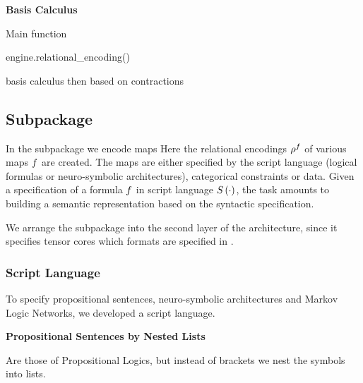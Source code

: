 \textbf{Basis Calculus}

Main function 
\begin{centeredcode}
	engine.relational\_encoding()
\end{centeredcode}
basis calculus then based on contractions





\subsection{Subpackage \spencoding}

In the \spencoding subpackage we encode maps 
Here the relational encodings $\rho^{f}$ of various maps $f$ are created.
%
The maps are either specified by the script language (logical formulas or neuro-symbolic architectures), categorical constraints or data.
Given a specification of a formula $f$ in script language $S\left(\cdot\right)$, the task amounts to building a semantic representation based on the syntactic specification.

We arrange the \spencoding subpackage into the second layer of the \tnreason architecture, since it specifies tensor cores which formats are specified in \spengine.


\subsubsection{Script Language}\label{subsec:scriptLanguage} %

To specify propositional sentences, neuro-symbolic architectures and Markov Logic Networks, we developed a script language.

\textbf{Propositional Sentences by Nested Lists}

Are those of Propositional Logics, but instead of brackets we nest the symbols into lists.

